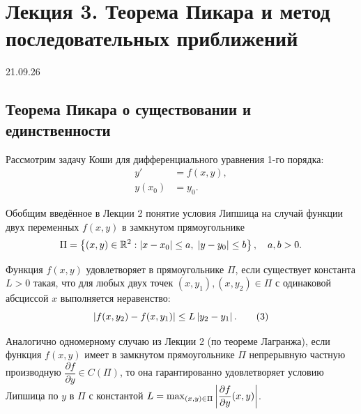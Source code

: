 \section{Лекция 3. Теорема Пикара и метод последовательных приближений}

\begin{flushright}
    21.09.26
\end{flushright}

\subsection{Теорема Пикара о существовании и единственности}

Рассмотрим задачу Коши для дифференциального уравнения 1-го порядка:
\begin{align}
    y' &= f(x, y), \tag{1} \label{eq:l3_cauchy_eq} \\
    y(x_0) &= y_0. \tag{2} \label{eq:l3_cauchy_ic}
\end{align}

Обобщим введённое в Лекции 2 понятие условия Липшица на случай функции двух
переменных $f(x, y)$ в замкнутом прямоугольнике
\[
    \Pi = \left\{ (x, y) \in \mathbb{R}^2 : \left| x - x_0 \right| \le a, \;
    \left| y - y_0 \right| \le b \right\}, \quad a, b > 0.
\]

\begin{definition}
    Функция $f(x, y)$ удовлетворяет 
    в прямоугольнике $\Pi$, если существует константа $L > 0$ такая, что для
    любых двух точек $(x, y_1), (x, y_2) \in \Pi$ с одинаковой абсциссой $x$
    выполняется неравенство:
    \begin{equation} \label{eq:l3_lipschitz_y}
        \left| f(x, y_2) - f(x, y_1) \right| \le L \left| y_2 - y_1 \right|. \tag{3}
    \end{equation}
\end{definition}

\begin{remark}
    Аналогично одномерному случаю из Лекции 2 (по теореме Лагранжа), если
    функция $f(x, y)$ имеет в замкнутом прямоугольнике $\Pi$ непрерывную
    частную производную $\dfrac{\partial f}{\partial y} \in C(\Pi)$, то она
    гарантированно удовлетворяет условию Липшица по $y$ в $\Pi$ с константой
    $L = \max_{(x, y) \in \Pi} \left| \dfrac{\partial f}{\partial y}(x, y) \right|$.
\end{remark}

